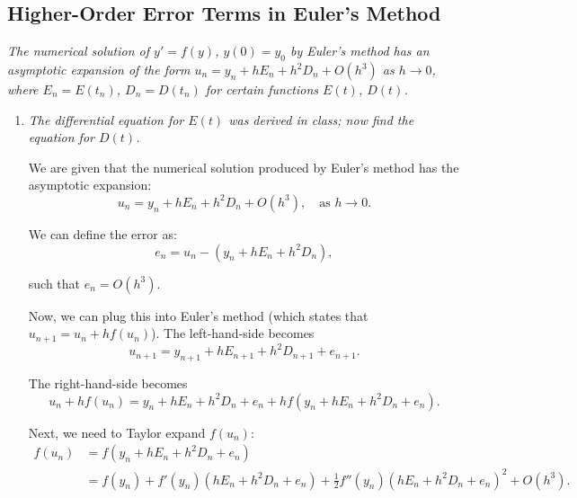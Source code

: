 \subsection{Higher-Order Error Terms in Euler’s Method}
\textit{The numerical solution of $y' = f(y)$, $y(0)=y_{0}$ by Euler's method has an asymptotic expansion of the form $u_{n} = y_{n}+hE_{n}+h^{2}D_{n}+O(h^{3})$ as $h \rightarrow 0$, where $E_{n}=E(t_{n})$, $D_{n}=D(t_{n})$ for certain functions $E(t)$, $D(t)$.}

\begin{enumerate}[label=(\alph*)]

    \item \textit{The differential equation for $E(t)$ was derived in class; now find the equation for $D(t)$.}
      \vspace{1em}

      We are given that the numerical solution produced by Euler's method has the asymptotic expansion:
      \begin{equation*}
          u_n = y_n + hE_n + h^2 D_n + O(h^3), \quad \text{as } h \to 0.
      \end{equation*}

      We can define the error as:
      \begin{equation*}
          e_{n} = u_{n} - (y_{n} + hE_{n} + h^{2}D_{n}),
      \end{equation*}

      such that $e_{n}=O(h^{3})$. 

      Now, we can plug this into Euler's method (which states that $u_{n+1} = u_n + h f(u_n)$). The left-hand-side becomes
      \begin{equation*}
          u_{n+1} = y_{n+1} + hE_{n+1} + h^{2}D_{n+1} + e_{n+1}.
      \end{equation*}

      The right-hand-side becomes
      \begin{equation*}
          u_{n} + hf(u_{n}) = y_{n} + hE_{n} + h^{2}D_{n} + e_{n} + hf(y_{n}+hE_{n}+h^{2}D_{n}+e_{n}).
      \end{equation*}

      Next, we need to Taylor expand $f(u_{n})$:
      \begin{align*}
        f(u_{n}) &= f(y_{n}+hE_{n}+h^{2}D_{n}+e_{n}) \\
                 &= f(y_{n}) + f'(y_{n})(hE_{n}+h^{2}D_{n}+e_{n}) + \frac{1}{2}f''(y_{n})(hE_{n}+h^{2}D_{n}+e_{n})^{2} + O(h^{3}).
      \end{align*}


\end{enumerate}
